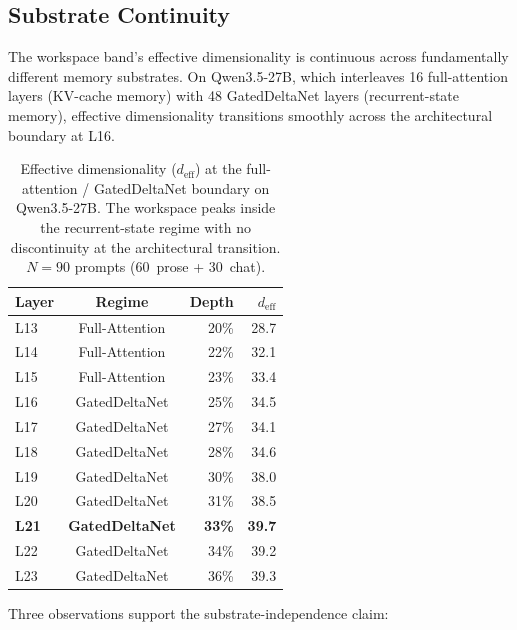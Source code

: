 
\subsection{Substrate Continuity}
\label{sec:substrate}

The workspace band's effective dimensionality is continuous across
fundamentally different memory substrates. On Qwen3.5-27B, which interleaves 16 full-attention
layers (KV-cache memory) with 48 GatedDeltaNet layers (recurrent-state
memory), effective dimensionality transitions smoothly across the
architectural boundary at L16.

\begin{table}[ht]
\centering
\small
\caption{Effective dimensionality ($d_\text{eff}$) at the
full-attention / GatedDeltaNet boundary on Qwen3.5-27B. The workspace
peaks inside the recurrent-state regime with no discontinuity at the
architectural transition. $N{=}90$ prompts (60~prose + 30~chat).}
\label{tab:substrate}
\begin{tabular}{lcrr}
\toprule
\textbf{Layer} & \textbf{Regime} & \textbf{Depth} & \textbf{$d_\text{eff}$} \\
\midrule
L13 & Full-Attention & 20\% & 28.7 \\
L14 & Full-Attention & 22\% & 32.1 \\
L15 & Full-Attention & 23\% & 33.4 \\
\midrule
L16 & GatedDeltaNet & 25\% & 34.5 \\
L17 & GatedDeltaNet & 27\% & 34.1 \\
L18 & GatedDeltaNet & 28\% & 34.6 \\
\addlinespace
L19 & GatedDeltaNet & 30\% & 38.0 \\
L20 & GatedDeltaNet & 31\% & 38.5 \\
\textbf{L21} & \textbf{GatedDeltaNet} & \textbf{33\%} & \textbf{39.7} \\
L22 & GatedDeltaNet & 34\% & 39.2 \\
L23 & GatedDeltaNet & 36\% & 39.3 \\
\bottomrule
\end{tabular}
\end{table}

Three observations support the substrate-independence claim:

